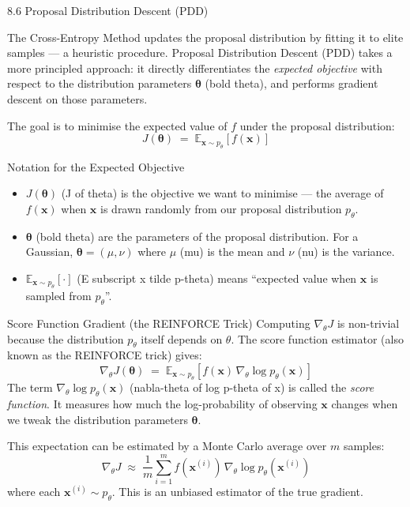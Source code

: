 \documentclass[aspectratio=169,10pt]{beamer}
\begin{document}
\begin{frame}[allowframebreaks]{8.6 Proposal Distribution Descent (PDD)}

The Cross-Entropy Method updates the proposal distribution by fitting it to elite samples --- a heuristic procedure.
Proposal Distribution Descent (PDD) takes a more principled approach: it directly differentiates the \emph{expected objective} with respect to the distribution parameters $\bm{\theta}$ (bold theta), and performs gradient descent on those parameters.

The goal is to minimise the expected value of $f$ under the proposal distribution:
\[
  J(\bm{\theta}) \;=\; \mathbb{E}_{\mathbf{x} \sim p_\theta}\!\left[f(\mathbf{x})\right]
\]

\begin{block}{Notation for the Expected Objective}
\begin{itemize}
  \item $J(\bm{\theta})$ (J of theta) is the objective we want to minimise --- the average of $f(\mathbf{x})$ when $\mathbf{x}$ is drawn randomly from our proposal distribution $p_\theta$.
  \item $\bm{\theta}$ (bold theta) are the parameters of the proposal distribution. For a Gaussian, $\bm{\theta} = (\mu, \nu)$ where $\mu$ (mu) is the mean and $\nu$ (nu) is the variance.
  \item $\mathbb{E}_{\mathbf{x} \sim p_\theta}[\cdot]$ (E subscript x tilde p-theta) means ``expected value when $\mathbf{x}$ is sampled from $p_\theta$''.
\end{itemize}
\end{block}

\begin{block}{Score Function Gradient (the REINFORCE Trick)}
Computing $\nabla_\theta J$ is non-trivial because the distribution $p_\theta$ itself depends on $\theta$. The score function estimator (also known as the REINFORCE trick) gives:
\[
  \nabla_\theta J(\bm{\theta}) \;=\; \mathbb{E}_{\mathbf{x} \sim p_\theta}\!\left[f(\mathbf{x})\,\nabla_\theta \log p_\theta(\mathbf{x})\right]
\]
The term $\nabla_\theta \log p_\theta(\mathbf{x})$ (nabla-theta of log p-theta of x) is called the \emph{score function}. It measures how much the log-probability of observing $\mathbf{x}$ changes when we tweak the distribution parameters $\bm{\theta}$.

This expectation can be estimated by a Monte Carlo average over $m$ samples:
\[
  \nabla_\theta J \;\approx\; \frac{1}{m}\sum_{i=1}^{m} f\!\left(\mathbf{x}^{(i)}\right)\,\nabla_\theta \log p_\theta\!\left(\mathbf{x}^{(i)}\right)
\]
where each $\mathbf{x}^{(i)} \sim p_\theta$. This is an unbiased estimator of the true gradient.
\end{block}


\end{frame}
\end{document}

